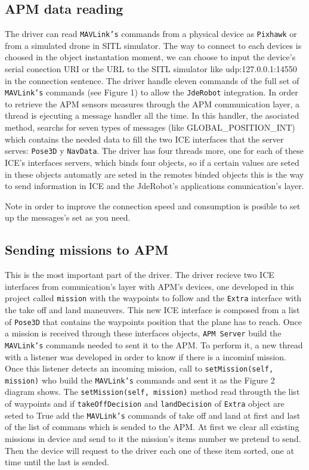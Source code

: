 \documentclass{llncs}
\begin{document}
\subsection{APM data reading}
\label{subsec:apm_data_reading}

The driver can read \texttt{MAVLink's} commands from a physical device as \texttt{Pixhawk} or from a simulated drone in SITL simulator. The way to connect to each devices is choosed in the object instantation moment, we can choose to input the device's serial conection URI or the URL to the SITL simulator like udp:127.0.0.1:14550 in the connection sentence.
The driver handle eleven commands of the full set of \texttt{MAVLink's} commands (see Figure 1) to allow the \texttt{JdeRobot} integration. 
In order to retrieve the APM sensors measures through the APM communication layer, a thread is ejecuting a message handler all the time.
In this handler, the asociated method, searchs for seven types of messages (like GLOBAL\_POSITION\_INT) which contains the needed data to fill the two ICE interfaces that the server serves: \texttt{Pose3D} y \texttt{NavData}.
The driver has four threads more, one for each of these ICE's interfaces servers, which binds four objects, so if a certain values are seted in these objects automatly are seted in the remotes binded objects this is the way to send information in ICE and the JdeRobot's applications comunication's layer.


Note in order to improve the connection speed and consumption is posible to set up the messages's set as you need.


\subsection{Sending missions to APM}
\label{sec:mission_apm}

This is the most important part of the driver. The driver recieve two ICE interfaces from comunication's layer with APM's devices, one developed in this project called \texttt{mission} with the waypoints to follow and the \texttt{Extra} interface with the take off and land maneuvers. This new ICE interface is composed from a list of \texttt{Pose3D} that contains the waypoints position that the plane has to reach.
Once a mission is received through these interfaces objects, \texttt{APM Server} build the \texttt{MAVLink's} commands needed to sent it to the APM. To perform it, a new thread with a listener was developed in order to know if there is a incominf mission.
Once this listener detects an incoming mission, call to \texttt{setMission(self, mission)} who build the \texttt{MAVLink's} commands and sent it as the Figure 2 diagram shows.
The \texttt{setMission(self, mission)} method read througth the list of waypoints and if \texttt{takeOffDecision} and \texttt{landDecision} of \texttt{Extra} object are seted to True add the \texttt{MAVLink's} commands of take off and land at first and last of the list of commans which is sended to the APM.
At first we clear all existing missions in device and send to it the mission's items number we pretend to send. Then the device will request to the driver each one of these item sorted, one at time until the last is sended. 
\end{document}
